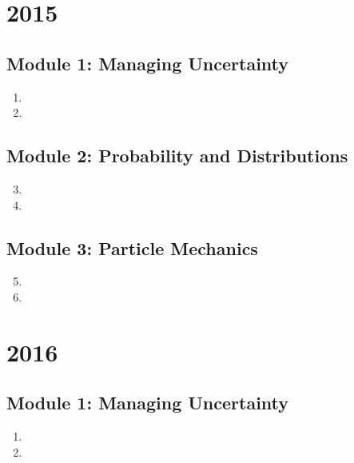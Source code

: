 \documentclass[fleqn,titlepage]{book}
\numberwithin{equation}{section}
\theoremstyle{plain}
\theoremstyle{definition}
\theoremstyle{remark}
\begin{document}
\chapter{2015}
\section{Module 1: Managing Uncertainty}
\begin{enumerate}[label=\bfseries  \arabic*.]\setcounter{enumi}{0}
\item 
\item 
\end{enumerate}
\section{Module 2: Probability and Distributions}
\begin{enumerate}[label=\bfseries  \arabic*.]\setcounter{enumi}{2}
\item 
\item 
\end{enumerate}
\section{Module 3: Particle Mechanics}
\begin{enumerate}[label=\bfseries  \arabic*.]\setcounter{enumi}{4}
\item 
\item 
\end{enumerate}

\chapter{2016}
\section{Module 1: Managing Uncertainty}
\begin{enumerate}[label=\bfseries  \arabic*.]\setcounter{enumi}{0}
\item 
\item 
\end{enumerate}
\end{document}
